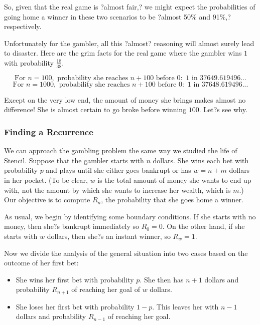 \documentclass[12pt,a4paper]{article}
\begin{document}
		So, given that the real game is ?almost fair,? we might expect the probabilities of going home a winner in these two scenarios to be ?almost 50\% and 91\%,? respectively.
		
		Unfortunately for the gambler, all this ?almost? reasoning will almost surely lead to disaster. Here are the grim facts for the real game where the gambler wins $1$ with probability $\frac{18}{38}$.
		
		\[
		\text{For } n = 100, \text{ probability she reaches } n + 100 \text{ before } 0: \text{ 1 in 37649.619496...}
		\]
		\[
		\text{For } n = 1000, \text{ probability she reaches } n + 100 \text{ before } 0: \text{ 1 in 37648.619496...}
		\]
		
		Except on the very low end, the amount of money she brings makes almost no difference! She is almost certain to go broke before winning $100$. Let?s see why.
		
		\subsubsection{Finding a Recurrence}
		
		We can approach the gambling problem the same way we studied the life of Stencil. Suppose that the gambler starts with $n$ dollars. She wins each bet with probability $p$ and plays until she either goes bankrupt or has $w = n + m$ dollars in her pocket. (To be clear, $w$ is the total amount of money she wants to end up with, not the amount by which she wants to increase her wealth, which is $m$.) Our objective is to compute $R_n$, the probability that she goes home a winner.
		
		As usual, we begin by identifying some boundary conditions. If she starts with no money, then she?s bankrupt immediately so $R_0 = 0$. On the other hand, if she starts with $w$ dollars, then she?s an instant winner, so $R_w = 1$.
		
		Now we divide the analysis of the general situation into two cases based on the outcome of her first bet:
		\begin{itemize}
			\item She wins her first bet with probability $p$. She then has $n + 1$ dollars and probability $R_{n+1}$ of reaching her goal of $w$ dollars.
			\item She loses her first bet with probability $1 - p$. This leaves her with $n - 1$ dollars and probability $R_{n-1}$ of reaching her goal.
		\end{itemize}
		
\end{document}
